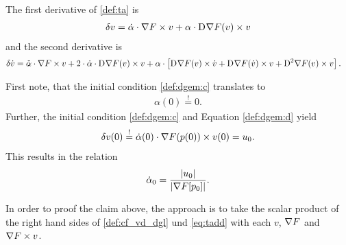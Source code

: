 The first derivative of \eqref{def:ta} is
\begin{align}
    \delta v  =
    \dot{ \alpha } \cdot \nabla F  \times v  +
    \alpha \cdot \mathrm{D}^{  } \nabla F  ( v ) \times v
    \label{eq:tad}
\end{align}
and the second derivative is
\begin{align}
    \delta \dot{ v }  &=
    \ddot{ \alpha } \cdot \nabla F  \times v  +
    2 \cdot \dot{ \alpha } \cdot \mathrm{D}^{  } \nabla F  ( v ) \times v  +
    \alpha \cdot \left[ \mathrm{D}^{  } \nabla F  ( v ) \times \dot{ v }  +
    \mathrm{D}^{  } \nabla F  ( \dot{ v } ) \times v  +  
    \mathrm{D}^{  2  } \nabla F  ( v ) \times v \right] .
    \label{eq:tadd}
\end{align}


First note, that the initial condition \eqref{def:dgem:c} translates to
\begin{align}
    \alpha( 0 )  \overset{!}{=}  0 .
\end{align}
Further, the initial condition \eqref{def:dgem:c}
and Equation \eqref{def:dgem:d} yield
\begin{align}
    \delta v( 0 )   \overset{!}{=}
    \dot{ \alpha }( 0 ) \cdot \nabla F( p( 0 ) ) \times v( 0 )  =  u_0 .
\end{align}
This results in the relation
\begin{align}
    \dot{ \alpha }_0   =
    \frac{ \lvert  u_0  \rvert }{ \lvert  \nabla F[ p_0 ]  \rvert } .
\end{align}


In order to proof the claim above,
the approach is to take the scalar product
of the right hand sides of \eqref{def:cf_vd_dgl} und \eqref{eq:tadd}
with each $ v $, $ \nabla F $ and $ \nabla F \times v $.


